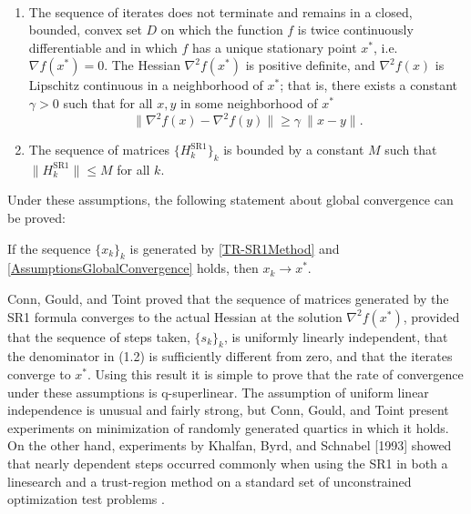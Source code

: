 \begin{assumption}\label{AssumptionsGlobalConvergence} \ \\[-1.5\baselineskip]
    \begin{enumerate}
        \item The sequence of iterates does not terminate and remains in a closed, bounded, convex set $D$ on which the function $f$ is twice continuously differentiable and in which $f$ has a unique stationary point $x^*$, i.e. $\nabla f(x^*) = 0$. The Hessian $\nabla^2 f(x^*)$ is positive definite, and $\nabla^2 f(x)$ is Lipschitz continuous in a neighborhood of $x^*$; that is, there exists a constant $\gamma > 0$ such that for all $x, y$ in some neighborhood of $x^*$ \begin{equation*} \lVert \nabla^2 f(x) - \nabla^2 f(y) \rVert \geq \gamma \ \lVert x - y \rVert. \end{equation*}
        \item The sequence of matrices $\{ H^{\mathrm{SR1}}_k \}_k$ is bounded by a constant $M$ such that $\lVert H^{\mathrm{SR1}}_k \rVert \leq M$ for all $k$.
    \end{enumerate}
\end{assumption}

Under these assumptions, the following statement about global convergence can be proved:

\begin{theorem} \label{GlobalConvergence}
    If the sequence $\{ x_k \}_k$ is generated by \cref{TR-SR1Method} and \cref{AssumptionsGlobalConvergence} holds, then $x_k \rightarrow x^*$.
\end{theorem}




Conn, Gould, and Toint proved that the sequence of matrices generated by the SR1 formula converges to the actual Hessian at the solution $\nabla^2 f(x^*)$, provided that the sequence of steps taken, $\{ s_k \}_k$, is uniformly linearly independent, that the denominator in (1.2) is sufficiently different from zero, and that the iterates converge to $x^*$. Using this result it is simple to prove that the rate of convergence under these assumptions is q-superlinear.  The assumption of uniform linear independence is unusual and fairly strong, but Conn, Gould, and Toint present experiments on minimization of randomly generated quartics in which it holds. On the other hand, experiments by Khalfan, Byrd, and Schnabel [1993] showed that nearly dependent steps occurred commonly when using the SR1 in both a linesearch and a trust-region method on a standard set of unconstrained optimization test problems \cite[p.~1026]{ByrdKhalfanSchnabel:1996}.



